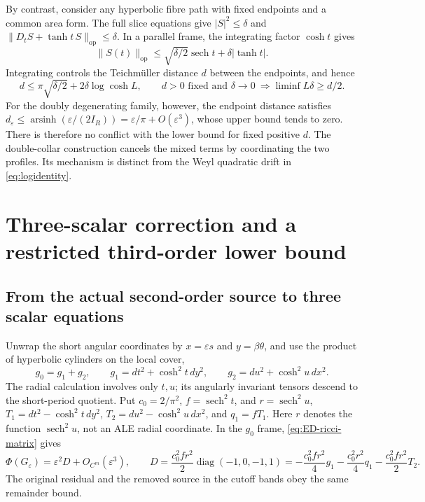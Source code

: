 \documentclass[a4paper,11pt]{article}
\numberwithin{equation}{section}
\theoremstyle{definition}
\newcommand{\op}{\mathrm{op}}
\begin{document}
By contrast, consider any hyperbolic fibre path with fixed endpoints and a common area form.
The full slice equations give
$|S|^2\le\delta$ and
$\|D_tS+\tanh t\,S\|_{\op}\le\delta$.
In a parallel frame, the integrating factor $\cosh t$ gives
\[
\|S(t)\|_{\op}\le\sqrt{\delta/2}\operatorname{sech}t+
\delta|\tanh t|.
\]
Integrating controls the Teichm\"uller distance $d$ between the endpoints, and hence
\begin{equation}\label{eq:ED-fixed-endpoints}
d\le\pi\sqrt{\delta/2}+2\delta\log\cosh L,\qquad
d>0\text{ fixed and }\delta\to0\ \Longrightarrow{}
\liminf L\delta\ge d/2.
\end{equation}
For the doubly degenerating family, however, the endpoint distance satisfies
$d_\varepsilon\le\operatorname{arsinh}(\varepsilon/(2I_R))
=\varepsilon/\pi+O(\varepsilon^3)$, whose upper bound tends to zero.
There is therefore no conflict with the lower bound for fixed positive $d$.
The double-collar construction cancels the mixed terms by coordinating the two profiles.
Its mechanism is distinct from the Weyl quadratic drift in \eqref{eq:logidentity}.

\section{Three-scalar correction and a restricted third-order lower bound}\label{sec:ED-third}
\subsection{From the actual second-order source to three scalar equations}\label{sec:ED-three-equations}
Unwrap the short angular coordinates by $x=\varepsilon s$ and $y=\beta\theta$,
and use the product of hyperbolic cylinders on the local cover,
\[
g_0=g_1+g_2,\qquad
g_1=dt^2+\cosh^2t\,dy^2,\qquad
g_2=du^2+\cosh^2u\,dx^2.
\]
The radial calculation involves only $t,u$; its angularly invariant tensors descend to the short-period quotient.
Put $c_0=2/\pi^2$, $f=\operatorname{sech}^2t$, and
$r=\operatorname{sech}^2u$,
$T_1=dt^2-\cosh^2t\,dy^2$,
$T_2=du^2-\cosh^2u\,dx^2$, and $q_1=fT_1$.
Here $r$ denotes the function $\operatorname{sech}^2u$, not an ALE radial coordinate.
In the $g_0$ frame, \eqref{eq:ED-ricci-matrix} gives
\begin{equation}\label{eq:ED-second-source}
\Phi(G_\varepsilon)=\varepsilon^2D+O_{C^m}(\varepsilon^3),\qquad
D=\frac{c_0^2fr^2}{2}\operatorname{diag}(-1,0,-1,1)
=-\frac{c_0^2fr^2}{4}g_1-\frac{c_0^2r^2}{4}q_1
-\frac{c_0^2fr^2}{2}T_2.
\end{equation}
The original residual and the removed source in the cutoff bands obey the same remainder bound.
\end{document}
